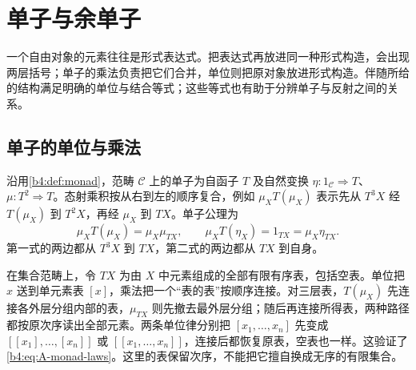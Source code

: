 

\section{单子与余单子}
\label{b4:sec:A01}

一个自由对象的元素往往是形式表达式。把表达式再放进同一种形式构造，会出现两层括号；单子的乘法负责把它们合并，单位则把原对象放进形式构造。伴随所给的结构满足明确的单位与结合等式；这些等式也有助于分辨单子与反射之间的关系。

\subsection{单子的单位与乘法}
\label{b4:subsec:A01:01}

沿用\cref{b4:def:monad}，范畴 \(\mathcal C\) 上的单子为自函子 \(T\) 及自然变换 \(\eta:1_{\mathcal C}\Rightarrow T\)、\(\mu:T^2\Rightarrow T\)。态射乘积按从右到左的顺序复合，例如 \(\mu_XT(\mu_X)\) 表示先从 \(T^3X\) 经 \(T(\mu_X)\) 到 \(T^2X\)，再经 \(\mu_X\) 到 \(TX\)。单子公理为
\begin{equation}\label{b4:eq:A-monad-laws}
	\mu_XT(\mu_X)=\mu_X\mu_{TX},\qquad \mu_XT(\eta_X)=1_{TX}=\mu_X\eta_{TX}.
\end{equation}
第一式的两边都从 \(T^3X\) 到 \(TX\)，第二式的两边都从 \(TX\) 到自身。

\ProseParagraphBreak

在集合范畴上，令 \(TX\) 为由 \(X\) 中元素组成的全部有限有序表，包括空表。单位把 \(x\) 送到单元素表 \([x]\)，乘法把一个“表的表”按顺序连接。对三层表，\(T(\mu_X)\) 先连接各外层分组内部的表，\(\mu_{TX}\) 则先撤去最外层分组；随后再连接所得表，两种路径都按原次序读出全部元素。两条单位律分别把 \([x_1,\ldots,x_n]\) 先变成 \([[x_1],\ldots,[x_n]]\) 或 \([[x_1,\ldots,x_n]]\)，连接后都恢复原表，空表也一样。这验证了\eqref{b4:eq:A-monad-laws}。这里的表保留次序，不能把它擅自换成无序的有限集合。

